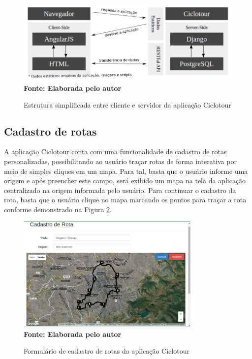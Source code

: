 \begin{figure}[!ht]
	\centering	
	\caption[\hspace{0.1cm} Estrutura simplificada entre cliente e servidor da aplicação Ciclotour.]
	{Estrutura simplificada entre cliente e servidor da aplicação Ciclotour}
	  \vspace{-0.4cm}
	\includegraphics[width=1\textwidth]{figuras/estruturaCiclotour.png}
	 \vspace{-0.3cm}
	\\\textbf{\footnotesize Fonte: Elaborada pelo autor}
	\label{fig:estruturaCiclotour}
\end{figure}

\subsection{Cadastro de rotas}
A aplicação Ciclotour conta com uma funcionalidade de cadastro de rotas personalizadas, possibilitando ao usuário traçar rotas de forma interativa 
por meio de simples cliques em um mapa. Para tal, basta que o usuário informe uma origem e após preencher este campo, será exibido um mapa na 
tela da aplicação centralizado na origem informada pelo usuário. Para continuar o cadastro da rota, basta que o usuário clique no mapa marcando os 
pontos para traçar a rota conforme demonstrado na Figura \ref{fig:cadastroRotas}. 

\begin{figure}[!ht]
	\centering	
	\caption[\hspace{0.1cm} Cadastro de Rotas da aplicação Ciclotour.]
	{Formulário de cadastro de rotas da aplicação Ciclotour}
	  \vspace{-0.4cm}
	\includegraphics[width=0.8\textwidth]{figuras/cadastroRotas.png}
	 \vspace{0cm}
	\\\textbf{\footnotesize Fonte: Elaborada pelo autor}
	\label{fig:cadastroRotas}
\end{figure}

